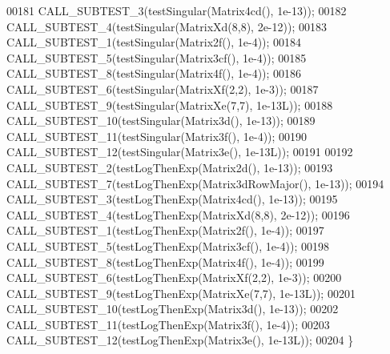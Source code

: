 \begin{DoxyCode}
00181   CALL\_SUBTEST\_3(testSingular(Matrix4cd(),        1e-13));
00182   CALL\_SUBTEST\_4(testSingular(MatrixXd(8,8),      2e-12));
00183   CALL\_SUBTEST\_1(testSingular(Matrix2f(),         1e-4));
00184   CALL\_SUBTEST\_5(testSingular(Matrix3cf(),        1e-4));
00185   CALL\_SUBTEST\_8(testSingular(Matrix4f(),         1e-4));
00186   CALL\_SUBTEST\_6(testSingular(MatrixXf(2,2),      1e-3));
00187   CALL\_SUBTEST\_9(testSingular(MatrixXe(7,7),      1e-13L));
00188   CALL\_SUBTEST\_10(testSingular(Matrix3d(),        1e-13));
00189   CALL\_SUBTEST\_11(testSingular(Matrix3f(),        1e-4));
00190   CALL\_SUBTEST\_12(testSingular(Matrix3e(),        1e-13L));
00191 
00192   CALL\_SUBTEST\_2(testLogThenExp(Matrix2d(),         1e-13));
00193   CALL\_SUBTEST\_7(testLogThenExp(Matrix3dRowMajor(), 1e-13));
00194   CALL\_SUBTEST\_3(testLogThenExp(Matrix4cd(),        1e-13));
00195   CALL\_SUBTEST\_4(testLogThenExp(MatrixXd(8,8),      2e-12));
00196   CALL\_SUBTEST\_1(testLogThenExp(Matrix2f(),         1e-4));
00197   CALL\_SUBTEST\_5(testLogThenExp(Matrix3cf(),        1e-4));
00198   CALL\_SUBTEST\_8(testLogThenExp(Matrix4f(),         1e-4));
00199   CALL\_SUBTEST\_6(testLogThenExp(MatrixXf(2,2),      1e-3));
00200   CALL\_SUBTEST\_9(testLogThenExp(MatrixXe(7,7),      1e-13L));
00201   CALL\_SUBTEST\_10(testLogThenExp(Matrix3d(),        1e-13));
00202   CALL\_SUBTEST\_11(testLogThenExp(Matrix3f(),        1e-4));
00203   CALL\_SUBTEST\_12(testLogThenExp(Matrix3e(),        1e-13L));
00204 \}
\end{DoxyCode}

